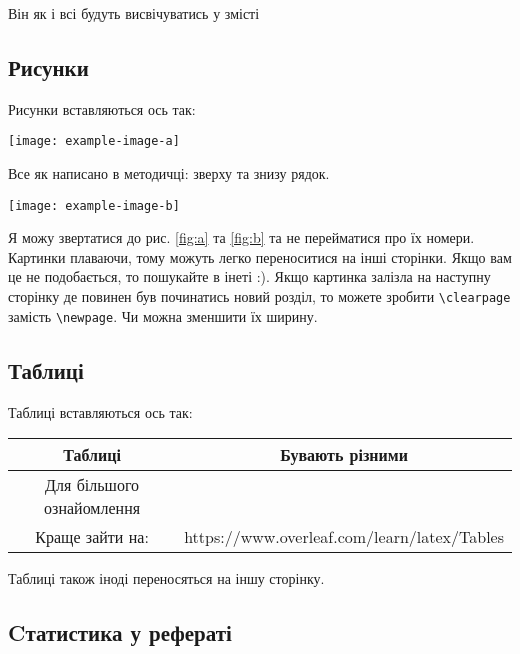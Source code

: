 \documentclass[a4paper, 14pt]{article}
\newlength{\magicspace}\setlength{\magicspace}{2\baselineskip}
\renewenvironment{figure}[1][]{\begin{oldfigure}[#1]\vspace{\magicspace}}{\vspace{\magicspace}\end{oldfigure}}
\renewenvironment{table}[1][]{\begin{oldtable}[#1]\vspace{\magicspace}}{\vspace{\glueexpr \magicspace - 8pt\relax}\end{oldtable}}
\begin{document}
Він як і всі будуть висвічуватись у змісті

\subsection{Рисунки}

Рисунки вставляються ось так:

\begin{figure}[h]
    \centering
    \texttt{[image: example-image-a]}
    \caption{Підписується правильно, та нумерується також}
    \label{fig:a}
\end{figure}

Все як написано в методичці: зверху та знизу рядок. 

\begin{figure}[h]
    \centering
    \texttt{[image: example-image-b]}
    \caption{Підписується правильно, та нумерується також}
    \label{fig:b}
\end{figure}

Я можу звертатися до рис. \ref{fig:a} та \ref{fig:b} та не перейматися про їх номери. Картинки плаваючи, тому можуть легко переноситися на інші сторінки. Якщо вам це не подобається, то пошукайте в інеті :). Якщо картинка залізла на наступну сторінку де повинен був починатись новий розділ, то можете зробити \verb|\clearpage| замість \verb|\newpage|. Чи можна зменшити їх ширину.

\subsection{Таблиці}

Таблиці вставляються ось так:

\begin{table}[h]
    \caption{Підписує як треба! з абзацу перед таблицею!}
    \centering
    \begin{tabular}{|c|c|} \hline
        Таблиці & Бувають різними \\ \hline
        Для більшого ознайомлення & \\
        Краще зайти на: & https://www.overleaf.com/learn/latex/Tables \\ \hline
    \end{tabular}
    \label{tab:my_label}
\end{table}

Таблиці також іноді переносяться на іншу сторінку.

\subsection{Cтатистика у рефераті}
\end{document}
